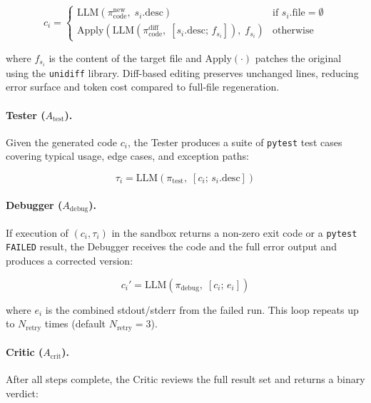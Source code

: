 \begin{equation}
  c_i =
  \begin{cases}
    \text{LLM}(\pi_\text{code}^\text{new},\; s_i.\text{desc})
      & \text{if } s_i.\text{file} = \emptyset \\
    \text{Apply}(\text{LLM}(\pi_\text{code}^\text{diff},\;
      [s_i.\text{desc};\, f_{s_i}]),\; f_{s_i})
      & \text{otherwise}
  \end{cases}
\end{equation}

\noindent where $f_{s_i}$ is the content of the target file
and $\text{Apply}(\cdot)$ patches the original using the
\texttt{unidiff} library. Diff-based editing preserves
unchanged lines, reducing error surface and token cost
compared to full-file regeneration.

\paragraph{Tester ($A_\text{test}$).}
Given the generated code $c_i$, the Tester produces a suite
of \texttt{pytest} test cases covering typical usage, edge
cases, and exception paths:

\begin{equation}
  \tau_i = \text{LLM}(\pi_\text{test},\;
           [c_i;\, s_i.\text{desc}])
\end{equation}

\paragraph{Debugger ($A_\text{debug}$).}
If execution of $(c_i, \tau_i)$ in the sandbox returns a
non-zero exit code or a \texttt{pytest} \texttt{FAILED}
result, the Debugger receives the code and the full error
output and produces a corrected version:

\begin{equation}
  c_i' = \text{LLM}(\pi_\text{debug},\; [c_i;\, e_i])
\end{equation}

\noindent where $e_i$ is the combined stdout/stderr from
the failed run. This loop repeats up to $N_\text{retry}$
times (default $N_\text{retry} = 3$).

\paragraph{Critic ($A_\text{crit}$).}
After all steps complete, the Critic reviews the full
result set and returns a binary verdict:

